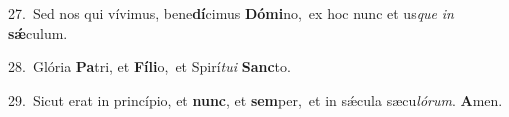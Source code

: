 {\numbfont\textcolor{\numbcolor}{27.}}~Sed nos qui vívimus, bene\-\textbf{dí}\-cimus \textbf{Dó}\-\textbf{mi}no,~\star ex hoc nunc et us\textit{que} \textit{in} \textbf{sǽ}\-culum.\par
{\numbfont\textcolor{\numbcolor}{28.}}~Glória \textbf{Pa}\-tri, et \textbf{Fí}\-\textbf{li}o,~\star et Spirí\-\textit{tu}\-\textit{i} \textbf{Sanc}\-to.\par
{\numbfont\textcolor{\numbcolor}{29.}}~Sicut erat in princípio, et \textbf{nunc}\-, et \textbf{sem}\-per,~\star et in sǽcula sæcu\-\textit{ló}\-\textit{rum}. \textbf{A}\-men.\par
